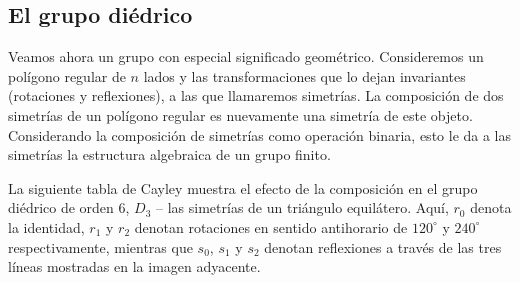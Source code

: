 
\subsection{El grupo diédrico}

Veamos ahora un grupo con especial significado geométrico. Consideremos un polígono regular de \(n\) lados y las transformaciones que lo dejan invariantes (rotaciones y reflexiones), a las que llamaremos simetrías. La composición de dos simetrías de un polígono regular es nuevamente una simetría de este objeto. Considerando la composición de simetrías como operación binaria, esto le da a las simetrías la estructura algebraica de un grupo finito.

La siguiente tabla de Cayley muestra el efecto de la composición en el grupo diédrico de orden 6, \(D_3\) -- las simetrías de un triángulo equilátero. Aquí, \(r_0\) denota la identidad, \(r_1\) y \(r_2\) denotan rotaciones en sentido antihorario de \(120^\circ\) y \(240^\circ\) respectivamente, mientras que \(s_0\), \(s_1\) y \(s_2\) denotan reflexiones a través de las tres líneas mostradas en la imagen adyacente.

